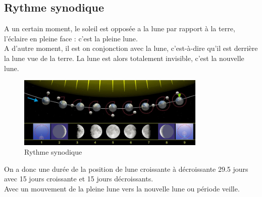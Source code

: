 \subsection{Rythme synodique}
A un certain moment, le soleil est opposée  a la lune par rapport à la terre, l’éclaire en pleine face : c’est la pleine lune.\\
A d’autre moment, il est on conjonction avec la lune, c’est-à-dire qu’il est derrière la lune vue de la terre. La lune est alors totalement invisible, c’est la nouvelle lune.\\
\begin{figure}[!h]
    	\center
    		\includegraphics[width=0.8\textwidth]{image/Moon_phases_00}
   		\caption{Rythme synodique}
    	\label{Rythme synodique}
	\end{figure}

On a donc une durée de la position de lune croissante à décroissante 29.5 jours avec 15 jours croissante et 15 jours décroissants.\\
Avec un mouvement de la pleine lune vers la nouvelle lune ou  période veille.
